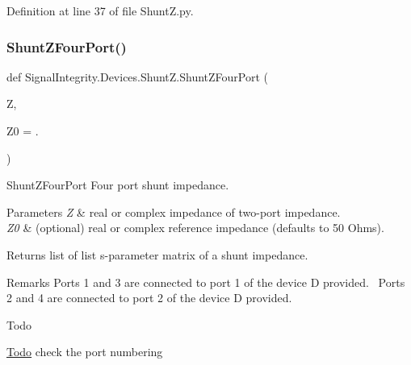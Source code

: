 Definition at line 37 of file Shunt\+Z.\+py.

\mbox{\label{namespaceSignalIntegrity_1_1Devices_1_1ShuntZ_a071383dcde5ba797b9f5882b739c77ee}} 
\subsubsection{\texorpdfstring{Shunt\+Z\+Four\+Port()}{ShuntZFourPort()}}
{\footnotesize\ttfamily def Signal\+Integrity.\+Devices.\+Shunt\+Z.\+Shunt\+Z\+Four\+Port (\begin{DoxyParamCaption}\item[{}]{Z,  }\item[{}]{Z0 = {.} }\end{DoxyParamCaption})}



Shunt\+Z\+Four\+Port Four port shunt impedance. 


\begin{DoxyParams}{Parameters}
{\em Z} & real or complex impedance of two-\/port impedance. \\
\hline
{\em Z0} & (optional) real or complex reference impedance (defaults to 50 Ohms). \\
\hline
\end{DoxyParams}
\begin{DoxyReturn}{Returns}
list of list s-\/parameter matrix of a shunt impedance.~\newline
 
\end{DoxyReturn}
\begin{DoxyRemark}{Remarks}
Ports 1 and 3 are connected to port 1 of the device D provided.~\newline
 Ports 2 and 4 are connected to port 2 of the device D provided.~\newline

\end{DoxyRemark}
\begin{DoxyRefDesc}{Todo}
\item[\hyperlink{todo__todo000005}{Todo}]check the port numbering \end{DoxyRefDesc}



